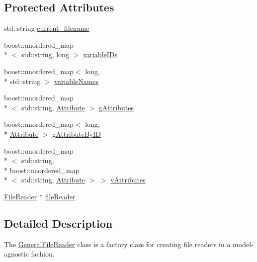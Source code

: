 \subsection*{Protected Attributes}
\begin{DoxyCompactItemize}
\item 
std\-::string \hyperlink{classccmc_1_1_general_file_reader_a5ccab7d8bd4672ee5d6210288d5f41bd}{current\-\_\-filename}
\item 
boost\-::unordered\-\_\-map\\*
$<$ std\-::string, long $>$ \hyperlink{classccmc_1_1_general_file_reader_a70d799a29940fa982885ce8c0963942d}{variable\-I\-Ds}
\item 
boost\-::unordered\-\_\-map$<$ long, \\*
std\-::string $>$ \hyperlink{classccmc_1_1_general_file_reader_aa3a4c9091feaec12035bcc981299de47}{variable\-Names}
\item 
boost\-::unordered\-\_\-map\\*
$<$ std\-::string, \hyperlink{classccmc_1_1_attribute}{Attribute} $>$ \hyperlink{classccmc_1_1_general_file_reader_ae5d6c9e0cebe12ce9564b99f1175f319}{g\-Attributes}
\item 
boost\-::unordered\-\_\-map$<$ long, \\*
\hyperlink{classccmc_1_1_attribute}{Attribute} $>$ \hyperlink{classccmc_1_1_general_file_reader_a395e6335be8a0c569489a9635f6b9252}{g\-Attribute\-By\-I\-D}
\item 
boost\-::unordered\-\_\-map\\*
$<$ std\-::string, \\*
boost\-::unordered\-\_\-map\\*
$<$ std\-::string, \hyperlink{classccmc_1_1_attribute}{Attribute} $>$ $>$ \hyperlink{classccmc_1_1_general_file_reader_a806b25ba22db767f9f61ae578634ef08}{v\-Attributes}
\item 
\hyperlink{classccmc_1_1_file_reader}{File\-Reader} $\ast$ \hyperlink{classccmc_1_1_general_file_reader_a255d7c592bd3908186af70794f05c0ea}{file\-Reader}
\end{DoxyCompactItemize}


\subsection{Detailed Description}
The \hyperlink{classccmc_1_1_general_file_reader}{General\-File\-Reader} class is a factory class for creating file readers in a model-\/agnostic fashion. 

